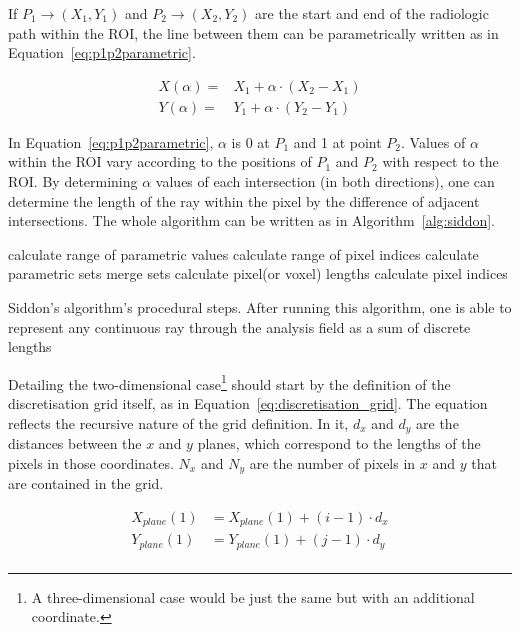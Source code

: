 If $P_1 \to (X_1, Y_1)$ and $P_2 \to (X_2, Y_2)$ are the start and
end of the radiologic path within the \gls{ROI}, the line between them
can be parametrically written as in Equation~\ref{eq:p1p2parametric}.

\begin{equation}
\label{eq:p1p2parametric}
    \begin{aligned}
        X(\alpha) = &X_1{} + \alpha \cdot (X_2 - X_1)\\
        Y(\alpha) = &Y_1{} + \alpha \cdot (Y_2 - Y_1)
    \end{aligned}
\end{equation}

In Equation~\ref{eq:p1p2parametric}, $\alpha$ is 0 at $P_1$ and 1 at
point $P_2$. Values of $\alpha$ within the \gls{ROI} vary according to
the positions of $P_1$ and $P_2$ with respect to the \gls{ROI}. By
determining $\alpha$ values of each intersection (in both directions),
one can determine the length of the ray within the pixel by the
difference of adjacent intersections. The whole algorithm can be written
as in Algorithm~\ref{alg:siddon}.

\begin{algorithm}[H]
\SetAlgoLined
{}
calculate range of parametric values\;
calculate range of pixel indices\;
calculate parametric sets\;
merge sets\;
calculate pixel(or voxel) lengths\;
calculate pixel indices\;
\caption{Siddon's algorithm's procedural steps. After running this
algorithm, one is able to represent any continuous ray through the
analysis field as a sum of discrete lengths}
\label{alg:siddon}
\end{algorithm}

Detailing the two-dimensional case\footnote{A
three-dimensional case would be just the same but with an additional
coordinate.} should start by the definition of the discretisation grid
itself, as in Equation~\ref{eq:discretisation_grid}. The equation
reflects the recursive nature of the grid definition. In it, $d_x$ and
$d_y$ are the distances between the $x$ and $y$ planes, which correspond
to the lengths of the pixels in those coordinates. $N_x$ and $N_y$ are
the number of pixels in $x$ and $y$ that are contained in the grid.

\begin{equation}
    \label{eq:discretisation_grid}
    \begin{aligned}
        X_{plane}(1) &= X_{plane}(1) + (i-1) \cdot d_x\\
        Y_{plane}(1) &= Y_{plane}(1) + (j-1) \cdot d_y\\
    \end{aligned}
\end{equation}


